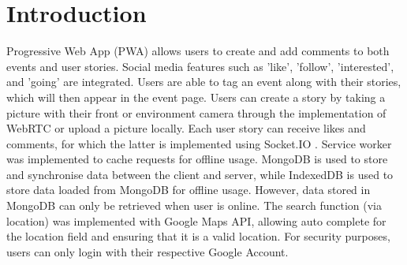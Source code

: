 \documentclass[11pt, a4paper]{article}
\begin{document}
\section{Introduction}
Progressive Web App (PWA) allows users to create and add comments to both events and user stories. 
Social media features such as 'like', 'follow', 'interested', and 'going' are integrated. Users 
are able to tag an event along with their stories, which will then appear in the event page. Users 
can create a story by taking a picture with their front or environment camera through the 
implementation of WebRTC or upload a picture locally. Each user story can receive likes and comments, 
for which the latter is implemented using Socket.IO \cite{socketio, week6}. Service worker was 
implemented to cache requests for offline usage. MongoDB is used to store and synchronise data 
between the client and server, while IndexedDB is used to store data loaded from MongoDB for offline 
usage. However, data stored in MongoDB can only be retrieved when user is online. The search function 
(via location) was implemented with Google Maps API, allowing auto complete for the location field 
and ensuring that it is a valid location. For security purposes, users can only login with their 
respective Google Account.
\end{document}
